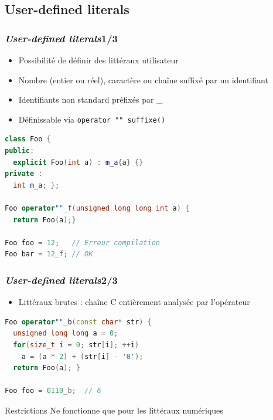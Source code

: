 \documentclass[C++.tex]{subfiles}
\begin{document}
\subsection*{User-defined literals}
\begin{frame}[fragile]
	\frametitle{\textit{User-defined literals}\titlehfill{}1/3}
	\begin{itemize}
		\item Possibilité de définir des littéraux \og utilisateur\fg{}
		\item Nombre (entier ou réel), caractère ou chaîne suffixé par un identifiant
		\item Identifiants non standard préfixés par \_


		\item Définissable via \lstinline|operator "" suffixe()|
	\end{itemize}

	\begin{lstlisting}[language=C++]
class Foo {
public:
  explicit Foo(int a) : m_a{a} {}
private :
  int m_a; };

Foo operator""_f(unsigned long long int a) {
  return Foo(a);}

Foo foo = 12;   // Erreur compilation
Foo bar = 12_f; // OK\end{lstlisting}

\end{frame}

\begin{frame}[fragile]
	\frametitle{\textit{User-defined literals}\titlehfill{}2/3}
	\begin{itemize}
		\item Littéraux brutes : chaîne C entièrement analysée par l'opérateur
	\end{itemize}
	
\begin{lstlisting}[language=C++]
Foo operator""_b(const char* str) {
  unsigned long long a = 0;
  for(size_t i = 0; str[i]; ++i)
    a = (a * 2) + (str[i] - '0');
  return Foo(a); }
		
Foo foo = 0110_b;  // 6\end{lstlisting}

	\begin{alertblock}{Restrictions}
		Ne fonctionne que pour les littéraux numériques
	\end{alertblock}
\end{frame}
\end{document}
